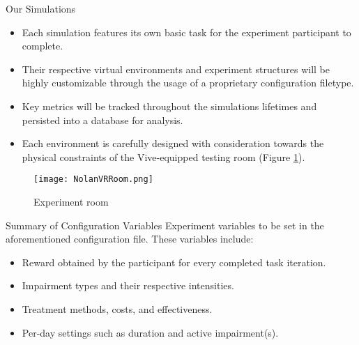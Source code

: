 \documentclass[22pt]{beamer}
\begin{document}
\begin{frame}[fragile]
\begin{textblock}{7.25}
\begin{block}{Our Simulations}\newline
\begin{itemize}
\item Each simulation features its own basic task for the experiment participant to complete.
\item Their respective virtual environments and experiment structures will be highly customizable through the usage of a proprietary configuration filetype. 
\item Key metrics will be tracked throughout the simulations\textsc{} lifetimes and persisted into a database for analysis.
\item Each environment is carefully designed with consideration towards the physical constraints of the Vive-equipped testing room (Figure \ref{fig:room}).
\end{itemize}
\newline
\begin{figure}
  \texttt{[image: NolanVRRoom.png]}
  \caption{Experiment room}
\label{fig:room}
\end{figure}
\end{block}


\begin{block}{Summary of Configuration Variables}\newline
Experiment variables to be set in the aforementioned configuration file. These variables include:
\begin{itemize}
\item Reward obtained by the participant for every completed task iteration.
\item Impairment types and their respective intensities.
\item Treatment methods, costs, and effectiveness.
\item Per-day settings such as duration and active impairment(s).
\end{itemize}
\end{block}





\end{textblock}
\end{frame}
\end{document}
